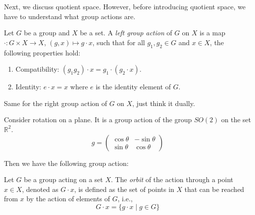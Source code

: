 \documentclass[
	11pt, %
	fleqn, %
	a4paper, %
]{LegrandOrangeBook}
\newcommand{\R}{\mathbb{R}} %
\begin{document}
Next, we discuss quotient space. However, before introducing quotient space, we have to understand what group actions are. 

\begin{definition}
    Let $G$ be a group and $X$ be a set. A \emph{left group action} of $G$ on $X$ is a map $\cdot : G \times X \to X$, $(g, x) \mapsto g \cdot x$, such that for all $g_1, g_2 \in G$ and $x \in X$, the following properties hold:
    \begin{enumerate}
        \item Compatibility: $(g_1 g_2) \cdot x = g_1 \cdot (g_2 \cdot x)$.
        \item Identity: $e \cdot x = x$ where $e$ is the identity element of $G$.
    \end{enumerate}
\end{definition}

Same for the right group action of $G$ on $X$, just think it dually.

Consider rotation on a plane. It is a group action of the group $SO(2)$ on the set $\R^2$.
\[
    g = \begin{pmatrix}
        \cos{\theta} & -\sin{\theta} \\
        \sin{\theta} & \cos{\theta}
    \end{pmatrix}
\]

Then we have the following group action:
\begin{center}
\end{center}

\begin{definition}[Orbits]
    Let $G$ be a group acting on a set $X$. The \emph{orbit} of the action through a point $x \in X$, denoted as $G \cdot x$, is defined as the set of points in $X$ that can be reached from $x$ by the action of elements of $G$, i.e., 
    \[
        G \cdot x = \{g \cdot x \mid g \in G\}
    \]
\end{definition}
\end{document}

